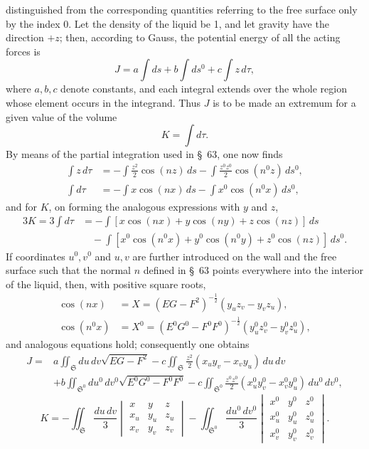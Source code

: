 \documentclass[11pt,a4paper,leqno]{article}
\begin{document}
distinguished from the corresponding quantities referring to the free
surface only by the index 0. Let the density of the liquid be 1, and let
gravity have the direction $+z$; then, according to Gauss, the potential
energy of all the acting forces is
\[
J=a\int ds+b\int ds^0+c\int z\,d\tau,
\]
where $a,b,c$ denote constants, and each integral extends over the
whole region whose element occurs in the integrand. Thus $J$ is to be
made an extremum for a given value of the volume
\[
K=\int d\tau.
\]
By means of the partial integration used in \S~63, one now finds
\[
\begin{aligned}
\int z\,d\tau
&=-\int\frac{z^2}{2}\cos(nz)\,ds
-\int\frac{z^0z^0}{2}\cos(n^0z)\,ds^0,\\
\int d\tau
&=-\int x\cos(nx)\,ds
-\int x^0\cos(n^0x)\,ds^0,
\end{aligned}
\]
and for $K$, on forming the analogous expressions with $y$ and $z$,
\[
\begin{aligned}
3K=3\int d\tau
&=-\int[x\cos(nx)+y\cos(ny)+z\cos(nz)]\,ds\\
&\quad-\int[x^0\cos(n^0x)+y^0\cos(n^0y)+z^0\cos(nz)]\,ds^0.
\end{aligned}
\]
If coordinates $u^0,v^0$ and $u,v$ are further introduced on the wall
and the free surface such that the normal $n$ defined in \S~63 points
everywhere into the interior of the liquid, then, with positive square roots,
\[
\begin{aligned}
\cos(nx)&=X=(EG-F^2)^{-\frac12}(y_uz_v-y_vz_u),\\
\cos(n^0x)&=X^0=(E^0G^0-F^0F^0)^{-\frac12}
(y_u^0z_v^0-y_v^0z_u^0),
\end{aligned}
\]
and analogous equations hold; consequently one obtains
\[
\begin{aligned}
J={}&a\iint_{\mathfrak{S}}du\,dv\sqrt{EG-F^2}
-c\iint_{\mathfrak{S}}\frac{z^2}{2}(x_uy_v-x_vy_u)\,du\,dv\\
&+b\iint_{\mathfrak{S}^0}du^0\,dv^0\sqrt{E^0G^0-F^0F^0}
-c\iint_{\mathfrak{S}^0}\frac{z^0z^0}{2}
(x_u^0y_v^0-x_v^0y_u^0)\,du^0\,dv^0,
\end{aligned}
\]
\[
K=-\iint_{\mathfrak{S}}\frac{du\,dv}{3}
\begin{vmatrix}
x&y&z\\x_u&y_u&z_u\\x_v&y_v&z_v
\end{vmatrix}
-\iint_{\mathfrak{S}^0}\frac{du^0\,dv^0}{3}
\begin{vmatrix}
x^0&y^0&z^0\\x_u^0&y_u^0&z_u^0\\x_v^0&y_v^0&z_v^0
\end{vmatrix}.
\]
\end{document}
